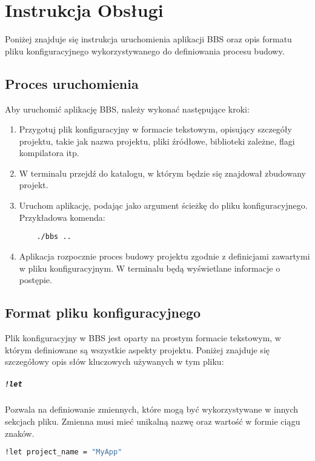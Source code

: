 \chapter{Instrukcja Obsługi}

Poniżej znajduje się instrukcja uruchomienia aplikacji BBS oraz opis formatu pliku konfiguracyjnego wykorzystywanego do definiowania procesu budowy.

\section{Proces uruchomienia}

Aby uruchomić aplikację BBS, należy wykonać następujące kroki:

\begin{enumerate}
	\item Przygotuj plik konfiguracyjny w formacie tekstowym, opisujący szczegóły projektu, takie jak nazwa projektu, pliki źródłowe, biblioteki zależne, flagi kompilatora itp.
	\item W terminalu przejdź do katalogu, w którym będzie się znajdował zbudowany projekt.
	\item Uruchom aplikację, podając jako argument ścieżkę do pliku konfiguracyjnego. Przykładowa komenda:
	\begin{lstlisting}
	./bbs ..
	\end{lstlisting}
	\item Aplikacja rozpocznie proces budowy projektu zgodnie z definicjami zawartymi w pliku konfiguracyjnym. W terminalu będą wyświetlane informacje o postępie.
\end{enumerate}
\section{Format pliku konfiguracyjnego}

Plik konfiguracyjny w BBS jest oparty na prostym formacie tekstowym, w którym definiowane są wszystkie aspekty projektu. Poniżej znajduje się szczegółowy opis słów kluczowych używanych w tym pliku:

\paragraph{\texttt{!let}} Pozwala na definiowanie zmiennych, które mogą być wykorzystywane w innych sekcjach pliku. Zmienna musi mieć unikalną nazwę oraz wartość w formie ciągu znaków.
\begin{lstlisting}[language=sh,alsoletter={!},keywords={!let,!prj,!files,!deps,!cflags,!pre,!post,!inc},keywordstyle=\bfseries]
!let project_name = "MyApp"
\end{lstlisting}


